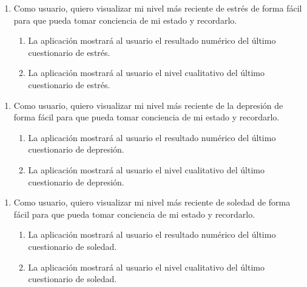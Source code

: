         \begin{enumerate}[resume=req-usuario,label=\textbf{\texttt{RU-\arabic*}}]
            \item \label{req:usuario:visualizar_estres} Como usuario, quiero visualizar mi nivel más reciente de estrés de forma fácil para que pueda tomar conciencia de mi estado y recordarlo.
            \begin{enumerate}[resume=req-funcionales,label=\textbf{\texttt{RF-\arabic*}}]
                \item \label{req:funcionales:visualizar_estres_numero} La aplicación mostrará al usuario el resultado numérico del último cuestionario de estrés.
                \item \label{req:funcionales:visualizar_estres_categoria} La aplicación mostrará al usuario el nivel cualitativo del último cuestionario de estrés.
            \end{enumerate}
        \end{enumerate}
        \begin{enumerate}[resume=req-usuario,label=\textbf{\texttt{RU-\arabic*}}]
            \item \label{req:usuario:visualizar_depresion} Como usuario, quiero visualizar mi nivel más reciente de la depresión de forma fácil para que pueda tomar conciencia de mi estado y recordarlo.
            
            \begin{enumerate}[resume=req-funcionales,label=\textbf{\texttt{RF-\arabic*}}]
                \item \label{req:funcionales:visualizar_depresion_numero} La aplicación mostrará al usuario el resultado numérico del último cuestionario de depresión.
                \item \label{req:funcionales:visualizar_depresion_categoria} La aplicación mostrará al usuario el nivel cualitativo del último cuestionario de depresión.
            \end{enumerate}
        \end{enumerate}
        \begin{enumerate}[resume=req-usuario,label=\textbf{\texttt{RU-\arabic*}}]
            \item \label{req:usuario:visualizar_soledad} Como usuario, quiero visualizar mi nivel más reciente de soledad de forma fácil para que pueda tomar conciencia de mi estado y recordarlo.
            \begin{enumerate}[resume=req-funcionales,label=\textbf{\texttt{RF-\arabic*}}]
                \item \label{req:funcionales:visualizar_soledad_numero} La aplicación mostrará al usuario el resultado numérico del último cuestionario de soledad.
                \item \label{req:funcionales:visualizar_soledad_categoria} La aplicación mostrará al usuario el nivel cualitativo del último cuestionario de soledad.
            \end{enumerate}
        \end{enumerate}
